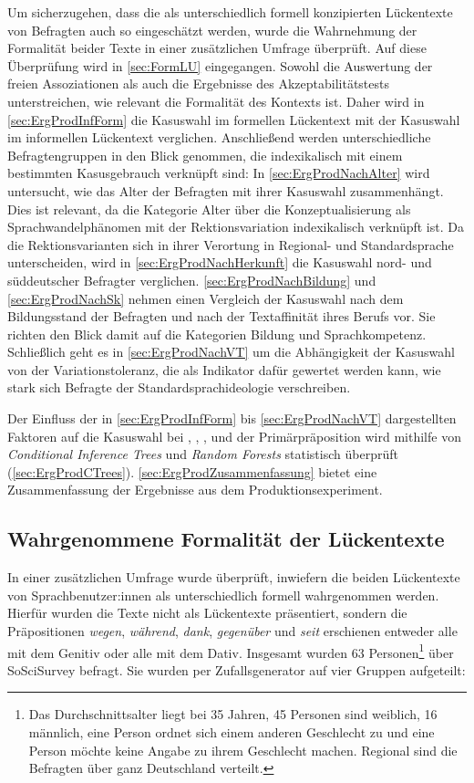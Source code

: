 Um sicherzugehen, dass die als unterschiedlich formell konzipierten Lückentexte von Befragten auch so eingeschätzt werden, wurde die Wahrnehmung der Formalität beider Texte in einer zusätzlichen Umfrage überprüft. 
Auf diese Überprüfung wird in \autoref{sec:FormLU} eingegangen. 
Sowohl die Auswertung der freien Assoziationen als auch die Ergebnisse des Akzeptabilitätstests unterstreichen, wie relevant die Formalität des Kontexts ist. Daher wird in \autoref{sec:ErgProdInfForm} die Kasuswahl im formellen Lückentext mit der Kasuswahl im informellen Lückentext verglichen. 
Anschließend werden unterschiedliche Befragtengruppen in den Blick genommen, die indexikalisch mit einem bestimmten Kasusgebrauch verknüpft sind:
In \autoref{sec:ErgProdNachAlter} wird untersucht, wie das Alter der Befragten mit ihrer Kasuswahl zusammenhängt.
Dies ist relevant, da die Kategorie \glqq Alter\grqq{} über die Konzeptualisierung als Sprachwandelphänomen mit der Rektionsvariation indexikalisch verknüpft ist. 
Da die Rektionsvarianten sich in ihrer Verortung in Regional- und Standardsprache unterscheiden, wird in \autoref{sec:ErgProdNachHerkunft} die Kasuswahl nord- und süddeutscher Befragter verglichen. 
\autoref{sec:ErgProdNachBildung} und \autoref{sec:ErgProdNachSk} nehmen einen Vergleich der Kasuswahl nach dem Bildungsstand der Befragten und nach der Textaffinität ihres Berufs vor.
Sie richten den Blick damit auf die {Ka\-te\-gorien} \glqq Bildung\grqq{} und \glqq Sprachkompetenz\grqq.
Schließlich geht es in \autoref{sec:ErgProdNachVT} um die Abhängigkeit der Kasuswahl von der Variationstoleranz, die als Indikator dafür gewertet werden kann, wie stark sich Befragte der Standardsprachideologie verschreiben. 

Der Einfluss der in \autoref{sec:ErgProdInfForm} bis \autoref{sec:ErgProdNachVT} dargestellten Faktoren auf die Kasuswahl bei \wegen, \waehrend, \dank, \gegenueber{} und der Primärpräposition  wird mithilfe von \textit{Conditional Inference Trees} und \textit{Random Forests} statistisch überprüft (\autoref{sec:ErgProdCTrees}). 
\autoref{sec:ErgProdZusammenfassung} bietet eine Zusammenfassung der Ergebnisse aus dem Produktionsexperiment. 
\subsection{Wahrgenommene Formalität der Lückentexte}
\label{sec:FormLU}
In einer zusätzlichen Umfrage wurde überprüft, inwiefern die beiden Lückentexte von Sprachbenutzer:innen als unterschiedlich formell wahrgenommen werden. 
Hierfür wurden die Texte nicht als Lückentexte präsentiert, sondern die Präpositionen \textit{wegen}, \textit{während}, \textit{dank}, \textit{gegenüber} und \textit{seit} erschienen entweder alle mit dem Genitiv oder alle mit dem Dativ. 
Insgesamt wurden 63 Personen\footnote{Das Durchschnittsalter liegt bei 35 Jahren, 45 Personen sind weiblich, 16 männlich, eine Person ordnet sich einem anderen Geschlecht zu und eine Person möchte keine Angabe zu ihrem Geschlecht machen. Regional sind die Befragten über ganz Deutschland verteilt.} über SoSciSurvey \citep{Leiner2014} befragt.
Sie wurden per Zufallsgenerator auf vier Gruppen aufgeteilt: 

